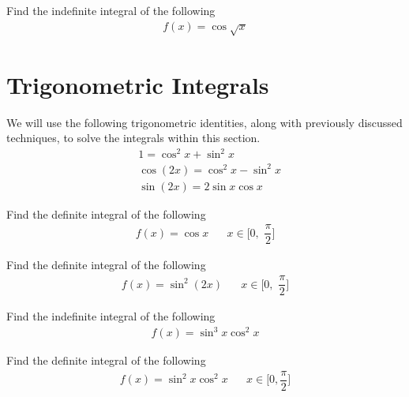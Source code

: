 \begin{exercise}
Find the indefinite integral of the following
\begin{align*}
    f(x) = \cos \sqrt{x}
\end{align*}
\end{exercise}

\newpage
\section{Trigonometric Integrals}

\begin{recall}
We will use the following trigonometric identities, along with previously discussed techniques, to solve the integrals within this section.
\begin{align*}
    &1 = \cos^{2} x + \sin^{2} x\\[2ex]
    &\cos(2x) = \cos^{2} x - \sin^{2} x\\[2ex]
    &\sin(2x) = 2\sin x \cos x
\end{align*}
\end{recall}

\begin{exercise}
Find the definite integral of the following
\begin{align*}
    f(x) = \cos x \hspace{20pt} x \in \Big[0, \hspace{4pt} \dfrac{\pi}{2} \Big]
\end{align*}
\end{exercise}

\begin{exercise}
Find the definite integral of the following
\begin{align*}
    f(x) = \sin^{2}(2x) \hspace{20pt} x \in \Big[0, \hspace{4pt} \dfrac{\pi}{2} \Big]
\end{align*}
\end{exercise}

\begin{exercise}
Find the indefinite integral of the following
\begin{align*}
    f(x) = \sin^{3} x \cos^{2} x
\end{align*}
\end{exercise}

\begin{exercise}
Find the definite integral of the following
\begin{align*}
    f(x) = \sin^{2} x \cos^{2} x \hspace{20pt} x \in \Big[0, \dfrac{\pi}{2} \Big]
\end{align*}
\end{exercise}

